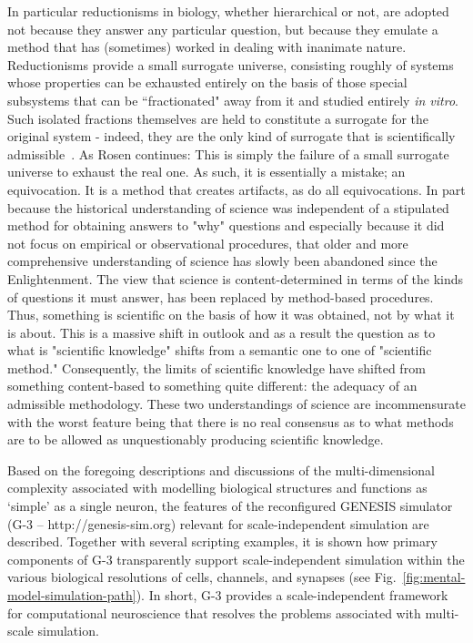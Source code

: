 \documentclass{article}
\begin{document}
In particular reductionisms in biology, whether hierarchical or not, are adopted not because they answer any particular question, but because they emulate a method that has (sometimes) worked in dealing with inanimate nature. Reductionisms provide a small surrogate universe, consisting roughly of systems whose properties can be exhausted entirely on the basis of those special subsystems that can be “fractionated" away from it and studied entirely \textit{in vitro}. Such isolated fractions themselves are held to constitute a surrogate for the original system - indeed, they are the only kind of surrogate that is scientifically admissible~\cite{rosen96}. As Rosen continues: This is simply the failure of a small surrogate universe to exhaust the real one. As such, it is essentially a mistake; an equivocation. It is a method that creates artifacts, as do all equivocations. In part because the historical understanding of science was independent of a stipulated method for obtaining answers to "why" questions and especially because it did not focus on empirical or observational procedures, that  older and more comprehensive understanding of science has slowly been abandoned since the Enlightenment. The view that science is content-determined in terms of the kinds of questions it must answer, has been replaced by method-based procedures. Thus, something is scientific on the basis of how it was obtained, not by what it is about. This is a massive shift in outlook and as a result the question as to what is "scientific knowledge" shifts from a semantic one to one of "scientific method." Consequently, the limits of scientific knowledge have shifted from something content-based to something quite different: the adequacy of an admissible methodology. These two understandings of science are incommensurate with the worst feature being that there is no real consensus as to what methods are to be allowed as unquestionably producing scientific knowledge.

Based on the foregoing descriptions and discussions of the multi-dimensional complexity associated with modelling biological structures and functions as ‘simple’ as a single neuron, the features of the reconfigured GENESIS simulator (G-3 -- http://genesis-sim.org) relevant for scale-independent simulation are described.  Together with several scripting examples, it is shown how primary components of G-3 transparently support scale-independent simulation within the various biological resolutions of cells, channels, and synapses (see Fig.~\ref{fig:mental-model-simulation-path}). In short, G-3 provides a scale-independent framework for computational neuroscience that resolves the problems associated with multi-scale simulation.
\end{document}
